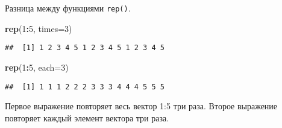\documentclass[
]{article}
\newenvironment{Shaded}{\begin{snugshade}}{\end{snugshade}}
\newcommand{\AttributeTok}[1]{\textcolor[rgb]{0.13,0.29,0.53}{#1}}
\newcommand{\DecValTok}[1]{\textcolor[rgb]{0.00,0.00,0.81}{#1}}
\newcommand{\FunctionTok}[1]{\textcolor[rgb]{0.13,0.29,0.53}{\textbf{#1}}}
\newcommand{\NormalTok}[1]{#1}
\newcommand{\SpecialCharTok}[1]{\textcolor[rgb]{0.81,0.36,0.00}{\textbf{#1}}}
\begin{document}
Разница между функциями \texttt{rep()}.

\begin{Shaded}
\begin{Highlighting}[]
\FunctionTok{rep}\NormalTok{(}\DecValTok{1}\SpecialCharTok{:}\DecValTok{5}\NormalTok{, }\AttributeTok{times=}\DecValTok{3}\NormalTok{)}
\end{Highlighting}
\end{Shaded}

\begin{verbatim}
##  [1] 1 2 3 4 5 1 2 3 4 5 1 2 3 4 5
\end{verbatim}

\begin{Shaded}
\begin{Highlighting}[]
\FunctionTok{rep}\NormalTok{(}\DecValTok{1}\SpecialCharTok{:}\DecValTok{5}\NormalTok{, }\AttributeTok{each=}\DecValTok{3}\NormalTok{)}
\end{Highlighting}
\end{Shaded}

\begin{verbatim}
##  [1] 1 1 1 2 2 2 3 3 3 4 4 4 5 5 5
\end{verbatim}

Первое выражение повторяет весь вектор 1:5 три раза. Второе выражение
повторяет каждый элемент вектора три раза.
\end{document}
